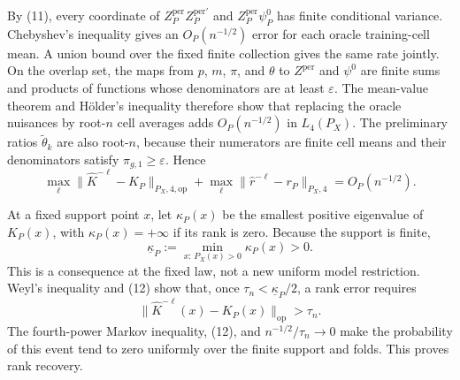 By (11), every coordinate of \(Z_P^{\mathrm{per}}Z_P^{\mathrm{per}\prime}\) and \(Z_P^{\mathrm{per}}\psi_P^0\) has finite conditional variance.  Chebyshev's inequality gives an \(O_P(n^{-1/2})\) error for each oracle training-cell mean.  A union bound over the fixed finite collection gives the same rate jointly.  On the overlap set, the maps from \(p\), \(m\), \(\pi\), and \(\theta\) to \(Z^{\mathrm{per}}\) and \(\psi^0\) are finite sums and products of functions whose denominators are at least \(\varepsilon\).  The mean-value theorem and Hölder's inequality therefore show that replacing the oracle nuisances by root-\(n\) cell averages adds \(O_P(n^{-1/2})\) in \(L_4(P_X)\).  The preliminary ratios \(\widetilde\theta_k\) are also root-\(n\), because their numerators are finite cell means and their denominators satisfy \(\pi_{g,1}\ge\varepsilon\).  Hence
\[
\max_\ell\|\widehat K^{-\ell}-K_P\|_{P_X,4,\mathrm{op}}
+\max_\ell\|\widehat r^{-\ell}-r_P\|_{P_X,4}=O_P(n^{-1/2}).
\tag{12}
\]

At a fixed support point \(x\), let \(\kappa_P(x)\) be the smallest positive eigenvalue of \(K_P(x)\), with \(\kappa_P(x)=+\infty\) if its rank is zero.  Because the support is finite,
\[
\underline\kappa_P:=\min_{x:\,P_X(x)>0}\kappa_P(x)>0.
\tag{13}
\]
This is a consequence at the fixed law, not a new uniform model restriction.  Weyl's inequality and (12) show that, once \(\tau_n<\underline\kappa_P/2\), a rank error requires
\[
\|\widehat K^{-\ell}(x)-K_P(x)\|_{\mathrm{op}}>\tau_n.
\]
The fourth-power Markov inequality, (12), and \(n^{-1/2}/\tau_n\to0\) make the probability of this event tend to zero uniformly over the finite support and folds.  This proves rank recovery.


